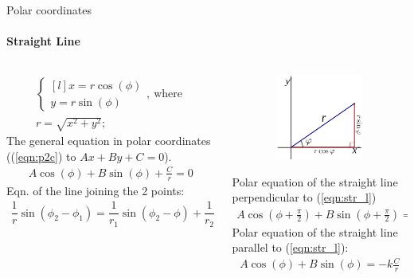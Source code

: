 \documentclass[aspectratio=169]{beamer}
\begin{document}
\begin{frame}[t]{Polar coordinates}
\framesubtitle{Straight Line}
\footnotesize
\begin{columns}[T,onlytextwidth]
    \begin{column}{0.49\textwidth}
        \vspace{-0.8cm}
        \begin{align}
            \label{eqn:p2c}
            \left\{\begin{matrix*}[l]
            x = r \cos(\phi)\\ 
            y = r \sin(\phi)
            \end{matrix*}\right. ,\ \text{where } \\
                r = \sqrt{x^2+y^2};
        \end{align}
    The general equation in polar coordinates ((\ref{eqn:p2c}) to $Ax+By+C=0$).
    \begin{align}
        \label{eqn:str_l}
        A\cos(\phi)+B\sin(\phi) + \frac{C}{r}=0
    \end{align}
    Eqn. of the line joining the 2 points:
    \begin{align*}
        \dfrac{1}{r}\sin(\phi_2-\phi_1)=\dfrac{1}{r_1}\sin({\phi_2-\phi}) + \dfrac{1}{r_2}\sin({\phi-\phi_1})
    \end{align*}
    \end{column}
    \begin{column}{0.49\textwidth}
        \vspace{-0.8cm}
        \begin{figure}[H]
            \centering\includegraphics[height=2.8cm,width=1\textwidth,keepaspectratio]{polar_to_cart.png}
            \label{fig:polar_to_cart.png}
        \end{figure}
        \vspace{-0.5cm}
        Polar equation of the straight line perpendicular to (\ref{eqn:str_l})
        \begin{align*}
            A\cos(\phi+\frac{\pi}{2}) + B\sin(\phi+\frac{\pi}{2})=-k\frac{C}{r}
        \end{align*}
        Polar equation of the straight line parallel to (\ref{eqn:str_l}):
        \begin{align*}
            A\cos(\phi) + B\sin(\phi)=-k\frac{C}{r}
        \end{align*}
    \end{column}
\end{columns}
\end{frame}
\end{document}
